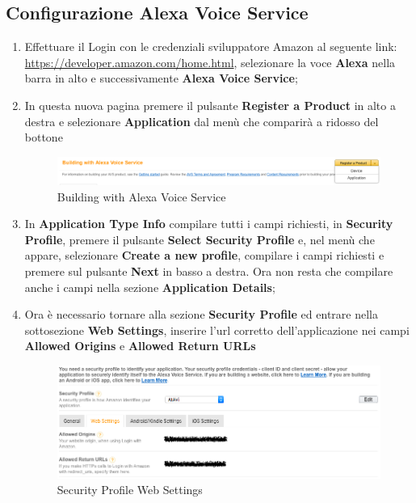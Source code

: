 \documentclass[../ManualeSviluppatore_v2.0.0.tex]{subfiles}
\begin{document}
	\subsection{Configurazione Alexa Voice Service}
		\begin{enumerate}
			\item Effettuare il Login con le credenziali sviluppatore Amazon al seguente link: \url{https://developer.amazon.com/home.html}, selezionare la voce \textbf{Alexa} nella barra in alto e successivamente \textbf{Alexa Voice Service};
			\item In questa nuova pagina premere il pulsante \textbf{Register a Product} in alto a destra e selezionare \textbf{Application} dal menù che comparirà a ridosso del bottone
				\begin{figure}[!h]
					\centering
					\includegraphics[width=\textwidth]{Screenshot/AVS/Application.png}
					\caption{Building with Alexa Voice Service}
				\end{figure}
			\item In \textbf{Application Type Info} compilare tutti i campi richiesti, in \textbf{Security Profile}, premere il pulsante \textbf{Select Security Profile} e, nel menù che appare, selezionare \textbf{Create a new profile}, compilare i campi richiesti e premere sul pulsante \textbf{Next} in basso a destra. Ora non resta che compilare anche i campi nella sezione \textbf{Application Details};
			\newpage
			\item Ora è necessario tornare alla sezione \textbf{Security Profile} ed entrare nella sottosezione \textbf{Web Settings}, inserire l'url corretto dell'applicazione \atavi nei campi \textbf{Allowed Origins} e \textbf{Allowed Return URLs}
				\begin{figure}[!h]
					\centering
					\includegraphics[width=\textwidth]{Screenshot/AVS/SecurityProfile.png}
					\caption{Security Profile \- Web Settings}
				\end{figure}
		\end{enumerate}
\end{document}
